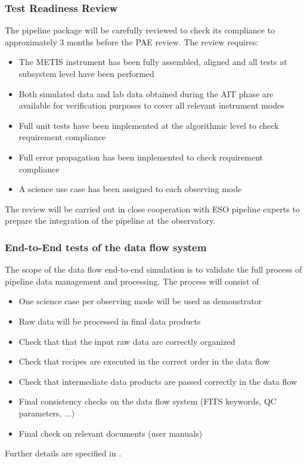 \subsubsection{Test Readiness Review}
\label{sssec:trr}

The pipeline package will be carefully reviewed to check its compliance to \cite{1618} approximately 3 months before the PAE review. The review requires:
\begin{itemize}
    \item The METIS instrument has been fully assembled, aligned and all tests at subsystem level have been performed
    \item Both simulated data and lab data obtained during the AIT phase are available for verification purposes to cover all relevant instrument modes
    \item Full unit tests have been implemented at the algorithmic level to check requirement compliance
    \item Full error propagation has been implemented to check requirement compliance
    \item A science use case has been assigned to each observing mode
\end{itemize}
The review will be carried out in close cooperation with ESO pipeline experts to prepare the integration of the pipeline at the observatory.

\subsubsection{End-to-End tests of the data flow system}
\label{sssec:e2e}

The scope of the data flow end-to-end simulation is to validate the full process of pipeline data management and processing. The process will consist of
\begin{itemize}
    \item One science case per observing mode will be used as demonstrator
    \item Raw data will be processed in final data products
    \item Check that that the input raw data are correctly organized
    \item Check that recipes are executed in the correct order in the data flow
    \item Check that intermediate data products are passed correctly in the data flow
    \item Final consistency checks on the data flow system (FITS keywords, QC parameters, ...)
    \item Final check on relevant documents (user manuals)
\end{itemize}
Further details are specified in \cite{DRLVT}.

